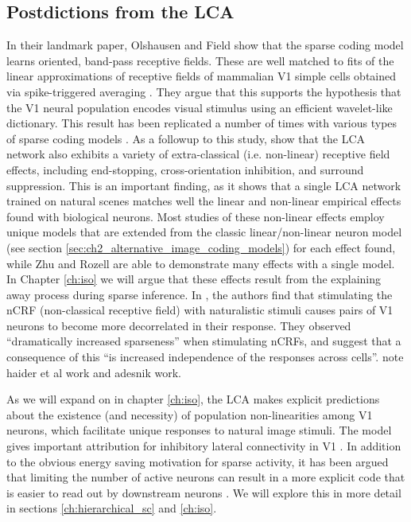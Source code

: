 \subsection{Postdictions from the LCA}
In their landmark paper, Olshausen and Field \citeyearpar{olshausen1996emergence} show that the sparse coding model learns oriented, band-pass receptive fields. These are well matched to fits of the linear approximations of receptive fields of mammalian V1 simple cells obtained via spike-triggered averaging \parencite{vanHateren1998independent}. They argue that this supports the hypothesis that the V1 neural population encodes visual stimulus using an efficient wavelet-like dictionary. This result has been replicated a number of times with various types of sparse coding models \parencite{zylberberg2011sparse, zylberberg2013sparse, rehn2007network}. As a followup to this study, \parencite{zhu2013visual} show that the LCA network also exhibits a variety of extra-classical (i.e. non-linear) receptive field effects, including end-stopping, cross-orientation inhibition, and surround suppression. This is an important finding, as it shows that a single LCA network trained on natural scenes matches well the linear and non-linear empirical effects found with biological neurons. Most studies of these non-linear effects employ unique models that are extended from the classic linear/non-linear neuron model (see section \ref{sec:ch2_alternative_image_coding_models}) for each effect found, while Zhu and Rozell are able to demonstrate many effects with a single model. In Chapter \ref{ch:iso} we will argue that these effects result from the explaining away process during sparse inference. In \parencite{vinje2000sparse}, the authors find that stimulating the nCRF (non-classical receptive field) with naturalistic stimuli causes pairs of V1 neurons to become more decorrelated in their response. They observed ``dramatically increased sparseness'' when stimulating nCRFs, and suggest that a consequence of this ``is increased independence of the responses across cells''. note haider et al work and adesnik work.

As we will expand on in chapter \ref{ch:iso}, the LCA makes explicit predictions about the existence (and necessity) of population non-linearities among V1 neurons, which facilitate unique responses to natural image stimuli. The model gives important attribution for inhibitory lateral connectivity in V1 \parencite{zhu2015modeling}. In addition to the obvious energy saving motivation for sparse activity, it has been argued that limiting the number of active neurons can result in a more explicit code that is easier to read out by downstream neurons \parencite{olshausen2003principles}. We will explore this in more detail in sections \ref{ch:hierarchical_sc} and \ref{ch:iso}.


